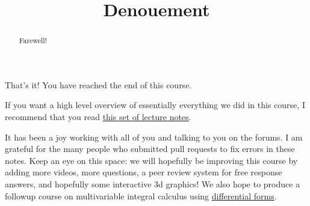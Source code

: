 \documentclass{ximera}
\title{Denouement}
\begin{document}
	\begin{abstract}
		Farewell!
	\end{abstract}
	
	That's it!  You have reached the end of this course.
	
	If you want a high level overview of essentially everything we did in this course, I recommend that you read 
	\href{http://math.caltech.edu/~ma108a/notesderivatice.pdf}{this set of lecture notes}.
	
	It has been a joy working with all of you and talking to you on the forums.  I am grateful for the many people who submitted pull requests
	to fix errors in these notes.  Keep an eye on this space:  we will hopefully be improving this course by adding more videos, more questions, a peer review system for 
	free response answers, 
	and hopefully some interactive 3d graphics!  We also hope to produce a followup course on multivariable integral calculus using 
	\href{http://en.wikipedia.org/wiki/Differential_form}{differential forms}.
\end{document}
